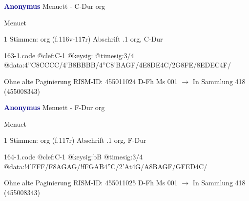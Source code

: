 \documentclass[twocolumn]{book}
\begin{document}
\newline \par \vspace{7pt} \textcolor{darkblue}{\textbf{Anonymus  }}
\newline Menuett - C-Dur
\newline org
\newline \begin{itshape}[f.116v, heading:] Menuet\end{itshape} 
\newline \textcolor{darkblue}{}  1 Stimmen: org  (f.116v-117r)
\newline Abschrift
.1  org, C-Dur  
\begin{filecontents*}{163-1.code}
@clef:C-1
@keysig:
@timesig:3/4
@data:4''C{8CCCC}/4'B{8BBBB}/4''C{8'BAGF}/4E{8DE}4C/2G{8FE}/{8EDEC}4F/
\end{filecontents*}
\newline
%
\newline Ohne alte Paginierung
\newline RISM-ID: 455011024
\newline D-Fh  Ms 001
\newline $\rightarrow$ In Sammlung 418 (455008343)
      
\newline \par \vspace{7pt} \textcolor{darkblue}{\textbf{Anonymus  }}
\newline Menuett - F-Dur
\newline org
\newline \begin{itshape}[f.117r, heading:] Menuet\end{itshape} 
\newline \textcolor{darkblue}{}  1 Stimmen: org  (f.117r)
\newline Abschrift
.1  org, F-Dur  
\begin{filecontents*}{164-1.code}
@clef:C-1
@keysig:bB
@timesig:3/4
@data:!4'FFF/F{8AGAG}/!f{FGAB}4''C/2'At4G/A{8BAGF}/{GFED}4C/
\end{filecontents*}
\newline
%
\newline Ohne alte Paginierung
\newline RISM-ID: 455011025
\newline D-Fh  Ms 001
\newline $\rightarrow$ In Sammlung 418 (455008343)
      
\end{document}
